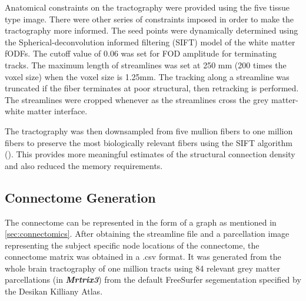 \documentclass[msthesis.tex]{subfiles}
\begin{document}
Anatomical constraints on the tractography were provided using the five tissue type image. There were other series of constraints imposed in order to make the  tractography more informed. The seed points were dynamically determined using the Spherical-deconvolution informed filtering (SIFT) model \cite{smith2013sift} of the white matter fODFs. The cutoff value of 0.06 was set for FOD amplitude for terminating tracks. The maximum length of streamlines was set at 250 mm (200 times the voxel size) when the voxel size is 1.25mm. The tracking along a streamline was truncated if the fiber terminates at poor structural, then  retracking is performed. The streamlines were cropped whenever as the streamlines cross the grey matter-white matter interface. 

The tractography was then downsampled from five mullion fibers to one million fibers to preserve the most biologically relevant fibers using the SIFT algorithm (\cite{smith2013sift}). This provides more meaningful estimates of the structural connection density and also reduced the memory requirements. 

\subsection{Connectome Generation}
\label{subsec:connectomegeneration}
The connectome can be represented in the form of a graph as mentioned in  \autoref{sec:connectomics}. After obtaining the streamline file and a parcellation image representing the subject specific node locations of the connectome, the connectome matrix was obtained in a .csv format. It was generated from the whole brain tractography of one million tracts using 84 relevant grey matter parcellations (in \textit{\textbf{Mrtrix3}}) from the default FreeSurfer segementation specified by the Desikan Killiany Atlas. 
\end{document}
